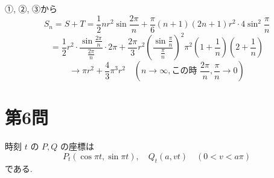 \documentclass[../main.tex]{subfiles}
\begin{document}
\vspace{1em}
\noindent
①, ②, ③から
\[
  S_n = S + T = \frac{1}{2} n r^2 \sin \frac{2\pi}{n} + \frac{\pi}{6} (n+1)(2n+1) r^2 \cdot 4 \sin^2 \frac{\pi}{n}
\]
\[
  = \frac{1}{2} r^2 \cdot \frac{\sin \frac{2\pi}{n}}{\frac{2\pi}{n}} \cdot 2\pi + \frac{2\pi}{3} r^2 \left( \frac{\sin \frac{\pi}{n}}{\frac{\pi}{n}} \right)^2 \pi^2 \left( 1 + \frac{1}{n} \right) \left( 2 + \frac{1}{n} \right)
\]
\[
  \to \pi r^2 + \frac{4}{3} \pi^3 r^2 \quad \left( n \to \infty, \text{この時 } \frac{2\pi}{n}, \frac{\pi}{n} \to 0 \right)
\]

\newpage

\section*{第6問}

\noindent
[\textbf{解}]

\noindent
時刻 $t$ の $P, Q$ の座標は
\[
  P_t (\cos \pi t, \sin \pi t), \quad Q_t (a, vt) \quad (0 < v < a\pi)
\]
である.
\end{document}
